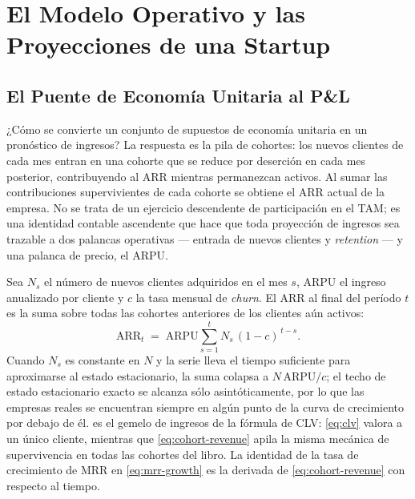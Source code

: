 \chapter{El Modelo Operativo y las Proyecciones de una Startup}\label{ch:operating-model}


\section{El Puente de Economía Unitaria al P\&L}\label{sec:unit-econ-to-pl}

¿Cómo se convierte un conjunto de supuestos de economía unitaria en un pronóstico de ingresos?
La respuesta es la pila de cohortes: los nuevos clientes de cada mes entran en una cohorte que
se reduce por deserción en cada mes posterior, contribuyendo al ARR mientras permanezcan
activos. Al sumar las contribuciones supervivientes de cada cohorte se obtiene el ARR actual de
la empresa. No se trata de un ejercicio descendente de participación en el TAM; es una identidad
contable ascendente que hace que toda proyección de ingresos sea trazable a dos palancas
operativas --- entrada de nuevos clientes y \emph{retention} --- y una palanca de precio, el ARPU.

Sea $N_s$ el número de nuevos clientes adquiridos en el mes $s$, ARPU el ingreso anualizado por
cliente y $c$ la tasa mensual de \emph{churn}. El ARR al final del período $t$ es la suma sobre
todas las cohortes anteriores de los clientes aún activos:
\begin{equation}\label{eq:cohort-revenue}
  \mathrm{ARR}_{t}
  \;=\;
  \mathrm{ARPU}
  \sum_{s=1}^{t}
  N_{s}\,(1-c)^{\,t-s}.
\end{equation}
Cuando $N_s$ es constante en $N$ y la serie lleva el tiempo suficiente para aproximarse al estado
estacionario, la suma colapsa a $N\,\mathrm{ARPU}/c$; el techo de estado estacionario exacto se
alcanza sólo asintóticamente, por lo que las empresas reales se encuentran siempre en algún
punto de la curva de crecimiento por debajo de él.
 es el gemelo de ingresos de la fórmula de CLV: \cref{eq:clv} valora a
un único cliente, mientras que \cref{eq:cohort-revenue} apila la misma mecánica de supervivencia
en todas las cohortes del libro. La identidad de la tasa de crecimiento de MRR en
\cref{eq:mrr-growth} es la derivada de \cref{eq:cohort-revenue} con respecto al tiempo.

